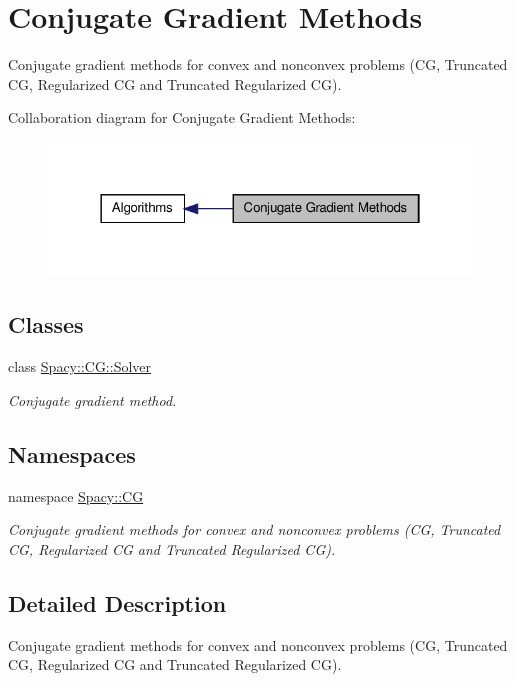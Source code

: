 \hypertarget{group__CGGroup}{\section{\-Conjugate \-Gradient \-Methods}
\label{group__CGGroup}
}


\-Conjugate gradient methods for convex and nonconvex problems (\-C\-G, \-Truncated \-C\-G, \-Regularized \-C\-G and \-Truncated \-Regularized \-C\-G).  


\-Collaboration diagram for \-Conjugate \-Gradient \-Methods\-:
\nopagebreak
\begin{figure}[H]
\begin{center}
\leavevmode
\includegraphics[width=322pt]{group__CGGroup}
\end{center}
\end{figure}
\subsection*{\-Classes}
\begin{DoxyCompactItemize}
\item 
class \hyperlink{classSpacy_1_1CG_1_1Solver}{\-Spacy\-::\-C\-G\-::\-Solver}
\begin{DoxyCompactList}\small\item\em \-Conjugate gradient method. \end{DoxyCompactList}\end{DoxyCompactItemize}
\subsection*{\-Namespaces}
\begin{DoxyCompactItemize}
\item 
namespace \hyperlink{namespaceSpacy_1_1CG}{\-Spacy\-::\-C\-G}
\begin{DoxyCompactList}\small\item\em \-Conjugate gradient methods for convex and nonconvex problems (\-C\-G, \-Truncated \-C\-G, \-Regularized \-C\-G and \-Truncated \-Regularized \-C\-G). \end{DoxyCompactList}\end{DoxyCompactItemize}


\subsection{\-Detailed \-Description}
\-Conjugate gradient methods for convex and nonconvex problems (\-C\-G, \-Truncated \-C\-G, \-Regularized \-C\-G and \-Truncated \-Regularized \-C\-G). 